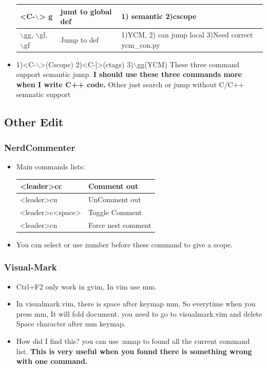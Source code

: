 \documentclass[a4paper,12pt,twoside]{book}
\begin{document}
\begin{itemize}
\begin{center}
\begin{tabular}{p{}|p{}|p{}}
		\hline
	   <C-$\backslash$> g & jumt to global def & 1) semantic 2)cscope \\


		\hline 
		$\backslash$gg, $\backslash$gl, $\backslash$gf & Jump to def & 1)YCM, 2) can jump local 3)Need correct ycm\_con.py  \\
		
				\end{tabular}
	\end{center}

	\item 1)<C-$\backslash$>(Cscope) 2)<C-]>(ctags) 3)$\backslash$gg(YCM) These three command support semantic jump. \textbf{I should use these three commands more when I write C++ code.}  Other just search or jump without C/C++ semnatic support

	\end{itemize}
	
\subsection{Other Edit}

\subsubsection{NerdCommenter}
\begin{itemize}
		\item Main commands lists:  

\begin{tabular}{p{}|p{}}
		\hline 
		[count]<leader>cc & Comment out \\
		\hline 
		[count]<leader>cu & UnComment out \\
		\hline 
		[count]<leader>c<space> & Toggle Comment \\
		\hline
		[count]<leader>cn & Force nest comment \\
\end{tabular}
\item You can select or use number before these command to give a scope. 
\end{itemize}

\subsubsection{Visual-Mark}
\begin{itemize}
		\item Ctrl+F2 only work in gvim, In vim use mm.
		\item In visualmark.vim, there is space after keymap mm, So everytime when you press mm, It will fold document. you need to go to visualmark.vim and delete Space character after mm keymap.
		\item How did I find this? you can use :nmap to found all the current command list. \textbf{This is very useful when you found there is something wrong with one command.}
\end{itemize}
\end{document}
